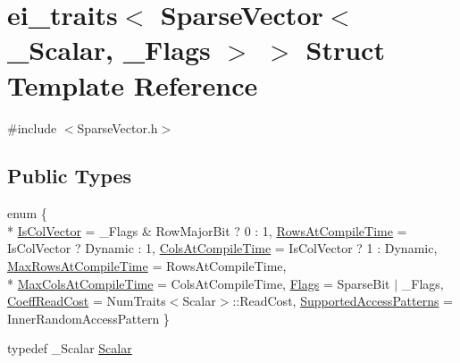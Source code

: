 \hypertarget{structei__traits_3_01_sparse_vector_3_01___scalar_00_01___flags_01_4_01_4}{\section{ei\-\_\-traits$<$ Sparse\-Vector$<$ \-\_\-\-Scalar, \-\_\-\-Flags $>$ $>$ Struct Template Reference}
\label{structei__traits_3_01_sparse_vector_3_01___scalar_00_01___flags_01_4_01_4}
}


{\ttfamily \#include $<$Sparse\-Vector.\-h$>$}

\subsection*{Public Types}
\begin{DoxyCompactItemize}
\item 
enum \{ \\*
\hyperlink{structei__traits_3_01_sparse_vector_3_01___scalar_00_01___flags_01_4_01_4_ab56fb0824ddaeaba687f7cc55d3e4367a7cdade4ba968bc77ce31f1334ff1e102}{Is\-Col\-Vector} = \-\_\-\-Flags \& Row\-Major\-Bit ? 0 \-: 1, 
\hyperlink{structei__traits_3_01_sparse_vector_3_01___scalar_00_01___flags_01_4_01_4_ab56fb0824ddaeaba687f7cc55d3e4367aef1f1b562ba5068dd6de5268b3ed107b}{Rows\-At\-Compile\-Time} = Is\-Col\-Vector ? Dynamic \-: 1, 
\hyperlink{structei__traits_3_01_sparse_vector_3_01___scalar_00_01___flags_01_4_01_4_ab56fb0824ddaeaba687f7cc55d3e4367a1972d2d0c89529a6680926388388cd0a}{Cols\-At\-Compile\-Time} = Is\-Col\-Vector ? 1 \-: Dynamic, 
\hyperlink{structei__traits_3_01_sparse_vector_3_01___scalar_00_01___flags_01_4_01_4_ab56fb0824ddaeaba687f7cc55d3e4367af0b8605d0dd728927af300306ad02bb9}{Max\-Rows\-At\-Compile\-Time} = Rows\-At\-Compile\-Time, 
\\*
\hyperlink{structei__traits_3_01_sparse_vector_3_01___scalar_00_01___flags_01_4_01_4_ab56fb0824ddaeaba687f7cc55d3e4367a9964900e35896409ad57d4ef21f25527}{Max\-Cols\-At\-Compile\-Time} = Cols\-At\-Compile\-Time, 
\hyperlink{structei__traits_3_01_sparse_vector_3_01___scalar_00_01___flags_01_4_01_4_ab56fb0824ddaeaba687f7cc55d3e4367a7de931cddda3903f9de219c35a63312a}{Flags} = Sparse\-Bit $|$ \-\_\-\-Flags, 
\hyperlink{structei__traits_3_01_sparse_vector_3_01___scalar_00_01___flags_01_4_01_4_ab56fb0824ddaeaba687f7cc55d3e4367a6de339c191dc0b264a7dfb1dafa25cae}{Coeff\-Read\-Cost} = Num\-Traits$<$Scalar$>$\-:\-:Read\-Cost, 
\hyperlink{structei__traits_3_01_sparse_vector_3_01___scalar_00_01___flags_01_4_01_4_ab56fb0824ddaeaba687f7cc55d3e4367aadf7b07b9333b2984751e215c8d1ba88}{Supported\-Access\-Patterns} = Inner\-Random\-Access\-Pattern
 \}
\item 
typedef \-\_\-\-Scalar \hyperlink{structei__traits_3_01_sparse_vector_3_01___scalar_00_01___flags_01_4_01_4_a7f6f54419189ca5c61043b90b2867067}{Scalar}
\end{DoxyCompactItemize}


